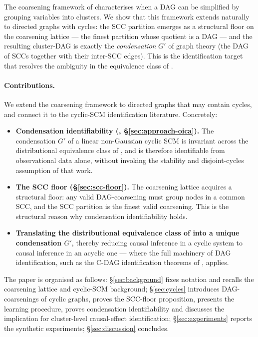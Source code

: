\documentclass{article}
\begin{document}
The coarsening framework of \citet{wahl2024foundations, madaleno2026coarsening} characterises when a DAG can be simplified by grouping variables into clusters. We show that this framework extends naturally to directed graphs with cycles: the SCC partition emerges as a structural floor on the coarsening lattice --- the finest partition whose quotient is a DAG --- and the resulting cluster-DAG is exactly the \emph{condensation} $G'$ of graph theory (the DAG of SCCs together with their inter-SCC edges). This is the identification target that resolves the ambiguity in the equivalence class of \citet{lacerda2008discovering}.

\paragraph{Contributions.} We extend the coarsening framework to directed graphs that may contain cycles, and connect it to the cyclic-SCM identification literature. Concretely:
\begin{itemize}
    \item \textbf{Condensation identifiability (, \S\ref{sec:approach-oica}).} The condensation $G'$ of a linear non-Gaussian cyclic SCM is invariant across the distributional equivalence class of \citet{lacerda2008discovering}, and is therefore identifiable from observational data alone, without invoking the stability and disjoint-cycles assumption of that work.
    \item \textbf{The SCC floor (\S\ref{sec:scc-floor}).} The coarsening lattice acquires a structural floor: any valid DAG-coarsening must group nodes in a common SCC, and the SCC partition is the finest valid coarsening. This is the structural reason why condensation identifiability holds.
    \item \textbf{Translating the distributional equivalence class of \citet{lacerda2008discovering} into a unique condensation $G'$}, thereby reducing causal inference in a cyclic system to causal inference in an acyclic one --- where the full machinery of DAG identification, such as the C-DAG identification theorems of \citet{anand2023causal}, applies.
\end{itemize}

The paper is organised as follows: \S\ref{sec:background} fixes notation and recalls the coarsening lattice and cyclic-SCM background; \S\ref{sec:cycles} introduces DAG-coarsenings of cyclic graphs, proves the SCC-floor proposition, presents the learning procedure, proves condensation identifiability and discusses the implication for cluster-level causal-effect identification; \S\ref{sec:experiments} reports the synthetic experiments; \S\ref{sec:discussion} concludes. 
\end{document}
